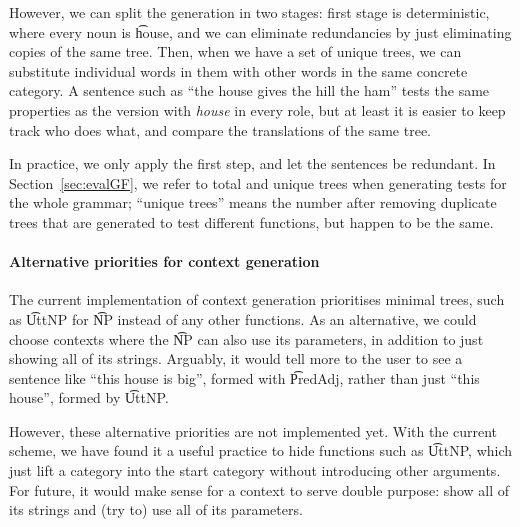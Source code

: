 However, we can split the generation in two stages:
first stage is deterministic, where every noun is \t{house}, and we
can eliminate redundancies by just eliminating copies of the same
tree. Then, when we have a set of unique trees, we can substitute
individual words in them with other words in the same concrete
category.  A sentence such as ``the house gives the hill the
ham'' tests the same properties as the version with \emph{house} in every
role, but at least it is easier to keep track who does what, and
compare the translations of the same tree.

In practice, we only apply the first step, and let the sentences be
redundant. In Section~\ref{sec:evalGF}, we refer to total and unique
trees when generating tests for the whole grammar; ``unique trees''
means the number after removing duplicate trees that are generated to
test different functions, but happen to be the same.

\paragraph{Alternative priorities for context generation} The current
implementation of context generation prioritises minimal trees, such
as \t{UttNP} for \t{NP} instead of any other functions. As an alternative,
we could choose contexts where the \t{NP} can also use its
parameters, in addition to just showing all of its strings. Arguably,
it would tell more to the user to see a sentence like ``this house is
big'', formed with \t{PredAdj}, rather than just ``this house'',
formed by \t{UttNP}.

However, these alternative priorities are not implemented yet. With
the current scheme, we have found it a useful practice to hide
functions such as \t{UttNP}, which just lift a category into the start
category without introducing other arguments. For future, it would
make sense for a context to serve double purpose: show all of its
strings and (try to) use all of its parameters.

%



